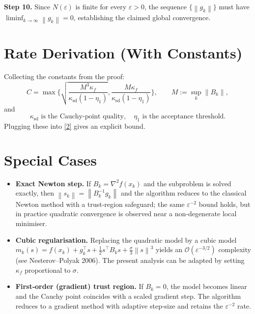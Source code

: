 \documentclass{article}
\newcommand{\norm}[1]{\left\lVert #1\right\rVert}
\begin{document}
\noindent\textbf{Step 10.} Since $N(\varepsilon)$ is finite for every $\varepsilon>0$, the sequence $\{\norm{g_k}\}$ must have $\liminf_{k\to\infty}\norm{g_k}=0$, establishing the claimed global convergence.

\section*{Rate Derivation (With Constants)}
Collecting the constants from the proof:
\[
C = \max\!\Big\{
\sqrt{\frac{M^3\kappa_f}{\kappa_{\text{sd}}(1-\eta_1)}},
\frac{M\kappa_f}{\kappa_{\text{sd}}(1-\eta_1)}
\Big\},
\qquad
M:=\sup_k\norm{B_k},
\]
and
\[
\kappa_{\text{sd}} \text{ is the Cauchy‑point quality},
\quad
\eta_1 \text{ is the acceptance threshold}.
\]
Plugging these into \eqref{2} gives an explicit bound.

\section*{Special Cases}
\begin{itemize}
\item \textbf{Exact Newton step.} If $B_k=\nabla^2 f(x_k)$ and the subproblem is solved exactly, then $\norm{s_k}= \norm{B_k^{-1}g_k}$ and the algorithm reduces to the classical Newton method with a trust‑region safeguard; the same $\varepsilon^{-2}$ bound holds, but in practice quadratic convergence is observed near a non‑degenerate local minimiser.
\item \textbf{Cubic regularisation.} Replacing the quadratic model by a cubic model $m_k(s)=f(x_k)+g_k^{\top}s+\tfrac12 s^{\top}B_k s+\frac{\sigma}{3}\norm{s}^3$ yields an $\mathcal O(\varepsilon^{-3/2})$ complexity (see Nesterov–Polyak 2006).  The present analysis can be adapted by setting $\kappa_f$ proportional to $\sigma$.
\item \textbf{First‑order (gradient) trust region.} If $B_k=0$, the model becomes linear and the Cauchy point coincides with a scaled gradient step.  The algorithm reduces to a gradient method with adaptive step‑size and retains the $\varepsilon^{-2}$ rate.
\end{itemize}
\end{document}
